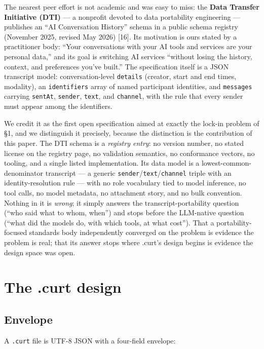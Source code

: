 \documentclass[11pt]{article}
\begin{document}
The nearest peer effort is not academic and was easy to miss: the \textbf{Data Transfer Initiative (DTI)} --- a nonprofit devoted to data portability engineering --- publishes an ``AI Conversation History'' schema in a public schema registry (November 2025, revised May 2026) [16]. Its motivation is ours stated by a practitioner body: ``Your conversations with your AI tools and services are your personal data,'' and its goal is switching AI services ``without losing the history, context, and preferences you've built.'' The specification itself is a JSON transcript model: conversation-level \texttt{details} (creator, start and end times, modality), an \texttt{identifiers} array of named participant identities, and \texttt{messages} carrying \texttt{sentAt}, \texttt{sender}, \texttt{text}, and \texttt{channel}, with the rule that every sender must appear among the identifiers.

We credit it as the first open specification aimed at exactly the lock-in problem of \S1, and we distinguish it precisely, because the distinction is the contribution of this paper. The DTI schema is a \emph{registry entry}: no version number, no stated license on the registry page, no validation semantics, no conformance vectors, no tooling, and a single listed implementation. Its data model is a lowest-common-denominator transcript --- a generic \texttt{sender}/\texttt{text}/\texttt{channel} triple with an identity-resolution rule --- with no role vocabulary tied to model inference, no tool calls, no model metadata, no attachment story, and no bulk convention. Nothing in it is \emph{wrong}; it simply answers the transcript-portability question (``who said what to whom, when'') and stops before the LLM-native question (``what did the models do, with which tools, at what cost''). That a portability-focused standards body independently converged on the problem is evidence the problem is real; that its answer stops where .curt's design begins is evidence the design space was open.

\section{The .curt design}

\subsection{Envelope}

A \texttt{.curt} file is UTF-8 JSON with a four-field envelope:
\end{document}
